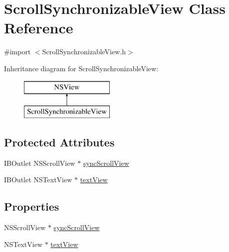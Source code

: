 \hypertarget{interface_scroll_synchronizable_view}{\section{Scroll\-Synchronizable\-View Class Reference}
\label{interface_scroll_synchronizable_view}
}


{\ttfamily \#import $<$Scroll\-Synchronizable\-View.\-h$>$}

Inheritance diagram for Scroll\-Synchronizable\-View\-:\begin{figure}[H]
\begin{center}
\leavevmode
\includegraphics[height=2.000000cm]{interface_scroll_synchronizable_view}
\end{center}
\end{figure}
\subsection*{Protected Attributes}
\begin{DoxyCompactItemize}
\item 
I\-B\-Outlet N\-S\-Scroll\-View $\ast$ \hyperlink{interface_scroll_synchronizable_view_aa8ce736dbbdec2361ad20cba4d4256fd}{sync\-Scroll\-View}
\item 
I\-B\-Outlet N\-S\-Text\-View $\ast$ \hyperlink{interface_scroll_synchronizable_view_aa970fe02665b05bf0662b70af803a017}{text\-View}
\end{DoxyCompactItemize}
\subsection*{Properties}
\begin{DoxyCompactItemize}
\item 
N\-S\-Scroll\-View $\ast$ \hyperlink{interface_scroll_synchronizable_view_a9dfdd7617a70252b6822ae03391b4c3d}{sync\-Scroll\-View}
\item 
N\-S\-Text\-View $\ast$ \hyperlink{interface_scroll_synchronizable_view_a910e28e896d7876ad29220c888fbc82a}{text\-View}
\end{DoxyCompactItemize}


